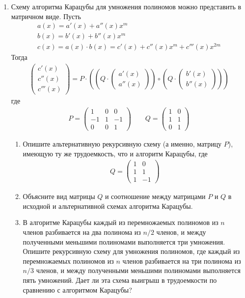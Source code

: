 \documentclass[11pt]{article}
\newenvironment{exercise}{\item}{}
\begin{document}
\begin{enumerate}
\begin{exercise}
Схему алгоритма Карацубы для умножения полиномов можно представить в матричном виде.
Пусть 
{\small
\begin{gather*} 
a(x) = a'(x) + a''(x) x^m\\
b(x) = b'(x) + b''(x) x^m\\ 
c(x) = a(x) \cdot b(x) = c'(x) + c''(x) x^m + c'''(x) x^{2m}
\end{gather*}}
%
Тогда
{\small
\begin{gather*} 
\begin{pmatrix}
c'(x) \\ c''(x) \\ c'''(x)
\end{pmatrix}
= 
P \cdot
\left(\left(
Q \cdot
\begin{pmatrix}
a'(x) \\ a''(x)
\end{pmatrix}
\right)
\circ
\left(
Q \cdot
\begin{pmatrix}
b'(x) \\ b''(x)
\end{pmatrix}
\right)\right)
\end{gather*}}
где
{\small
\begin{gather*} 
P = 
\begin{pmatrix}
1 & 0 & 0 \\ -1 & 1 & -1 \\ 0 & 0 & 1
\end{pmatrix}
\qquad
Q =
\begin{pmatrix}
1 & 0 \\ 1 & 1 \\ 0 & 1
\end{pmatrix}
\end{gather*}}
%
\begin{enumerate}
%
\item Опишите альтернативную рекурсивную схему (а именно, матрицу $P$), 
имеющую ту же трудоемкость, что и алгоритм Карацубы, где 
{\small
\begin{gather*} 
Q =
\begin{pmatrix}
1 & 0 \\ 1 & 1 \\ 1 & -1
\end{pmatrix}
\end{gather*}}
%
\item Объясните вид матрицы $Q$ и соотношение между матрицами $P$ и $Q$ 
в исходной и альтернативной схемах алгоритма Карацубы.  %
%
\item В алгоритме Карацубы каждый из перемножаемых полиномов из $n$ членов 
разбивается на два полинома из $n/2$ членов, 
и между полученными меньшими полиномами выполняется три умножения.
Опишите рекурсивную схему для умножения полиномов,
где каждый из перемножаемых полиномов из $n$ членов 
разбивается на три полинома из $n/3$ членов, 
и между полученными меньшими полиномами выполняется пять умножений.
Дает ли эта схема выигрыш в трудоемкости по сравнению с алгоритмом Карацубы?
%
\end{enumerate}


\end{exercise}
\end{enumerate}
\end{document}

